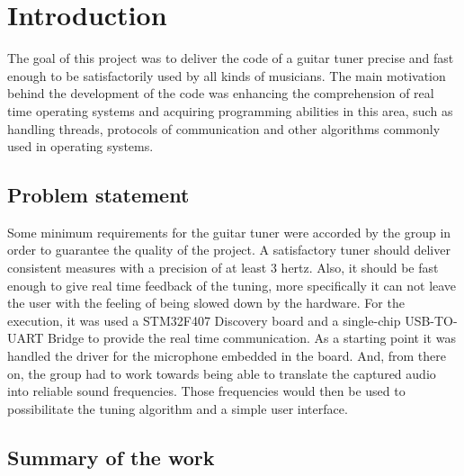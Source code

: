 \section{Introduction}
The goal of this project was to deliver the code of a guitar tuner precise and fast enough to be satisfactorily used by all kinds of musicians. The main motivation behind the development of the code was enhancing the comprehension of real time operating systems and acquiring programming abilities in this area, such as handling threads, protocols of communication and other algorithms commonly used in operating systems.\newline

\subsection{Problem statement}

Some minimum requirements for the guitar tuner were accorded by the group in order to guarantee the quality of the project. A satisfactory tuner should deliver consistent measures with a precision of at least 3 hertz. Also, it should be fast enough to give real time feedback of the tuning, more specifically it can not leave the user with the feeling of being slowed down by the hardware.\newline
For the execution, it was used a STM32F407 Discovery board and a single-chip USB-TO-UART Bridge to provide the real time communication. As a starting point it was handled the driver for the microphone embedded in the board. And, from there on, the group had to work towards being able to translate the captured audio into reliable sound frequencies. Those frequencies would then be used to possibilitate the tuning algorithm and a simple user interface.\newline
  
\subsection{Summary of the work}

